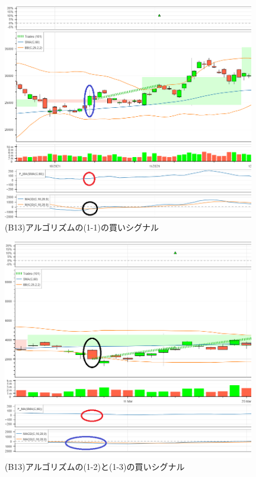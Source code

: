      
 

 




 


  



   

   \begin{figure}[H]
    \centering
    \includegraphics[width=110mm]{fig/bbandfma0_or_macd_paint.png}
    \caption{(B13)アルゴリズムの(1-1)の買いシグナル}
    \label{fig:bbfma0ormacd}
   \end{figure}

   \begin{figure}[H]
    \centering
    \includegraphics[width=110mm]{fig/bbandfma_or_macd0_paint.png}
    \caption{(B13)アルゴリズムの(1-2)と(1-3)の買いシグナル}
    \label{fig:bbfmaormacd0}
   \end{figure}
     \newpage